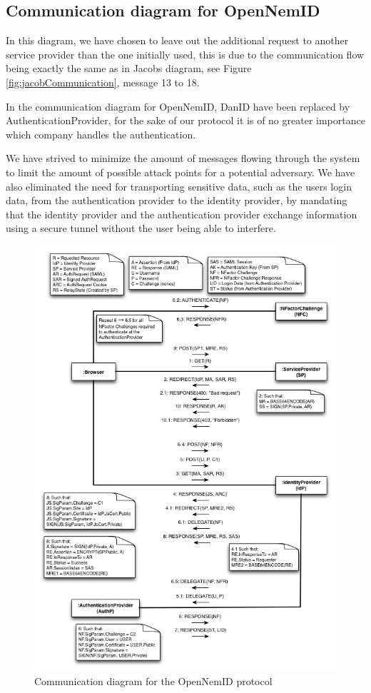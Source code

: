 \documentclass[twosided]{report}
\begin{document}
\subsection{Communication diagram for OpenNemID}
In this diagram, we have chosen to leave out the additional request to another service provider than the one initially used, this is due to the communication flow being exactly the same as in Jacobs diagram, see Figure \ref{fig:jacobCommunication}, message 13 to 18.
\par
In the communication diagram for OpenNemID, DanID have been replaced by AuthenticationProvider, for the sake of our protocol it is of no greater importance which company handles the authentication.
\par
We have strived to minimize the amount of messages flowing through the system to limit the amount of possible attack points for a potential adversary. We have also eliminated the need for transporting sensitive data, such as the users login data, from the authentication provider to the identity provider, by mandating that the identity provider and the authentication provider exchange information using a secure tunnel without the user being able to interfere.

\begin{figure}[H]
	\centering
	\includegraphics[scale=0.6]{images/Communication.png}
	\caption{Communication diagram for the OpenNemID protocol}
	\label{fig:ourCommunication}
\end{figure}
\end{document}
